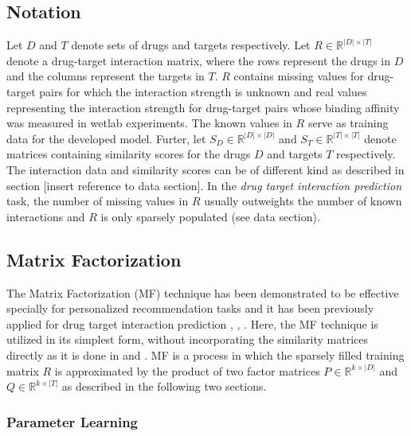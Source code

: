 \subsection{Notation}
\label{sec:Notation}
Let $D$ and $T$ denote sets of drugs and targets respectively. Let $R \in \mathbb{R} ^{|D| \times |T|}$ denote a drug-target interaction matrix, where the rows represent the drugs in $D$ and the columns represent the targets in $T$. $R$ contains missing values for drug-target pairs for which the interaction strength is unknown and real values representing the interaction strength for drug-target pairs whose binding affinity was measured in wetlab experiments. The known values in $R$ serve as training data for the developed model. Furter, let $S_D \in \mathbb{R}^{|D| \times |D|}$ and $S_T \in \mathbb{R}^{|T| \times |T|}$ denote matrices containing similarity scores for the drugs $D$ and targets $T$ respectively. The interaction data and similarity scores can be of different kind as described in section [insert reference to data section].  In the \textit{drug target interaction prediction} task, the number of missing values in $R$ usually outweights the number of known interactions and $R$ is only sparsely populated (see data section).

\subsection{Matrix Factorization}
\label{sec:MF}
The Matrix Factorization (MF) technique has been demonstrated to be effective specially for personalized recommendation tasks \cite{Koren:2009:MFT:1608565.1608614} and it has been previously applied for drug target interaction prediction \cite{liu2016neighborhood}, \cite{ezzat2016drug}, \cite{gonen2013kernelized}. Here, the MF technique is utilized in its simplest form, without incorporating the similarity matrices directly as it is done in \cite{liu2016neighborhood} and \cite{gonen2013kernelized}. MF is a process in which the sparsely filled training matrix $R$ is approximated by the product of two factor matrices $P \in \mathbb{R}^{k\times |D|}$ and $Q \in \mathbb{R}^{k\times |T|}$ as described in the following two sections.

\subsubsection{Parameter Learning}

